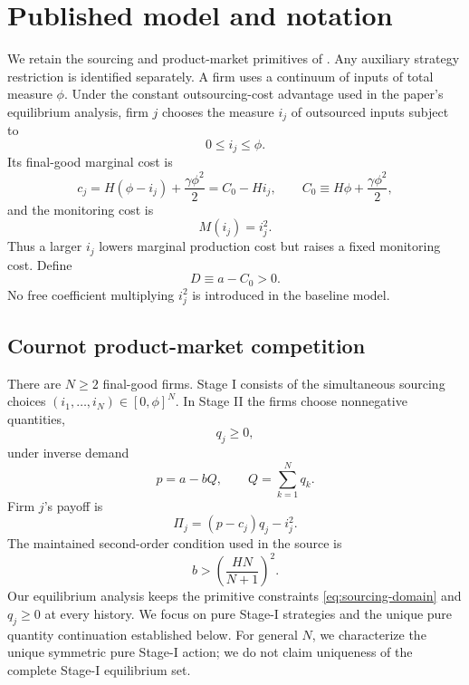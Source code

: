 \section{Published model and notation}
\label{sec:model}

We retain the sourcing and product-market primitives of \cite{ShyStenbacka2005}.  Any auxiliary strategy restriction is identified separately.  A firm uses a continuum of inputs of total measure \(\phi\).  Under the constant outsourcing-cost advantage used in the paper's equilibrium analysis, firm \(j\) chooses the measure \(i_j\) of outsourced inputs subject to
\begin{equation}
0\le i_j\le \phi .
\label{eq:sourcing-domain}
\end{equation}
Its final-good marginal cost is
\begin{equation}
c_j
=
H(\phi-i_j)+\frac{\gamma\phi^2}{2}
=
C_0-Hi_j,
\qquad
C_0\equiv H\phi+\frac{\gamma\phi^2}{2},
\label{eq:mc}
\end{equation}
and the monitoring cost is
\begin{equation}
M(i_j)=i_j^2.
\label{eq:monitoring}
\end{equation}
Thus a larger \(i_j\) lowers marginal production cost but raises a fixed monitoring cost.  Define
\begin{equation}
D\equiv a-C_0>0.
\label{eq:D}
\end{equation}
No free coefficient multiplying \(i_j^2\) is introduced in the baseline model.

\subsection{Cournot product-market competition}

There are \(N\ge2\) final-good firms.  Stage I consists of the simultaneous sourcing choices \((i_1,\ldots,i_N)\in[0,\phi]^N\).  In Stage II the firms choose nonnegative quantities,
\[
q_j\ge0,
\]
under inverse demand
\begin{equation}
p=a-bQ,\qquad Q=\sum_{k=1}^N q_k .
\label{eq:inverse-demand}
\end{equation}
Firm \(j\)'s payoff is
\begin{equation}
\Pi_j=(p-c_j)q_j-i_j^2 .
\label{eq:cournot-profit}
\end{equation}
The maintained second-order condition used in the source is
\begin{equation}
b>\left(\frac{HN}{N+1}\right)^2.
\label{eq:source-soc}
\end{equation}
Our equilibrium analysis keeps the primitive constraints \eqref{eq:sourcing-domain} and \(q_j\ge0\) at every history.  We focus on pure Stage-I strategies and the unique pure quantity continuation established below.  For general \(N\), we characterize the unique symmetric pure Stage-I action; we do not claim uniqueness of the complete Stage-I equilibrium set.

